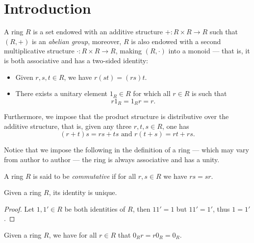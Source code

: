 \section{Introduction}

%
\begin{definition}[Ring]
\label{def:ring}
A ring \(R\) is a set endowed with an additive structure \(+: R \times R \to R\)
such that \((R, +)\) is an \emph{abelian group}, moreover, \(R\) is also endowed
with a second multiplicative structure \(\cdot: R \times R \to R\), making
\((R, \cdot)\) into a monoid --- that is, it is both associative and has a
two-sided identity:
\begin{itemize}\setlength\itemsep{0em}
\item Given \(r, s, t \in R\), we have \(r (s t) = (r s) t\).

\item There exists a unitary element \(1_R \in R\) for which all \(r \in R\) is
  such that
  \[
    r 1_R = 1_R r = r.
  \]
\end{itemize}
Furthermore, we impose that the product structure is distributive over the
additive structure, that is, given any three \(r, t, s \in R\), one has
\[
  (r + t) s = r s + t s \text{ and } r (t + s) = r t + r s.
\]
\end{definition}
%

%
\begin{remark}
\label{rem:def-ring}
Notice that we impose the following in the definition of a ring --- which may
vary from author to author --- the ring is always associative and has a unity.
\end{remark}
%

%
\begin{definition}
\label{def:commutative-ring}
A ring \(R\) is said to be \emph{commutative} if for all \(r, s \in R\) we have
\(r s = s r\).
\end{definition}
%

%
\begin{corollary}
\label{cor:ring-unique-identity}
Given a ring \(R\), its identity is unique.
\end{corollary}
%

%
\begin{proof}
Let \(1, 1' \in R\) be both identities of \(R\), then \(1 1' = 1\) but \(1 1' =
1'\), thus \(1 = 1'\).
\end{proof}
%

%
\begin{corollary}
\label{cor:zero-element-ring}
Given a ring \(R\), we have for all \(r \in R\) that \(0_R r = r 0_R = 0_R\).
\end{corollary}
%

